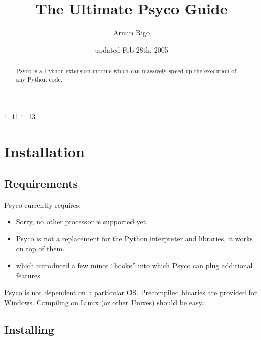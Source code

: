 \documentclass{manual}
\title{The Ultimate Psyco Guide}
\author{Armin Rigo}
\date{updated Feb 28th, 2005}
\begin{document}
\catcode`\@=11
\renewcommand{\py@reset}{}
\catcode`\@=13

\maketitle


\begin{abstract}

\noindent
Psyco is a Python extension module which can massively speed up the execution of any Python code.


\end{abstract}

\tableofcontents


\chapter{Installation}

\section{Requirements}\label{req}

Psyco currently requires:

\begin{itemize}
  
\item {}  Sorry, no other processor is supported yet.
  
\item {}  Psyco is not a replacement for the Python interpreter and libraries, it works on top of them.
  
\item {} which introduced a few minor ``hooks'' into which Psyco can plug additional features.
  
\end{itemize}

Psyco is not dependent on a particular OS.  Precompiled binaries are provided for Windows.  Compiling on Linux (or other Unixes) should be easy.


\section{Installing}\label{binaries}
\end{document}
